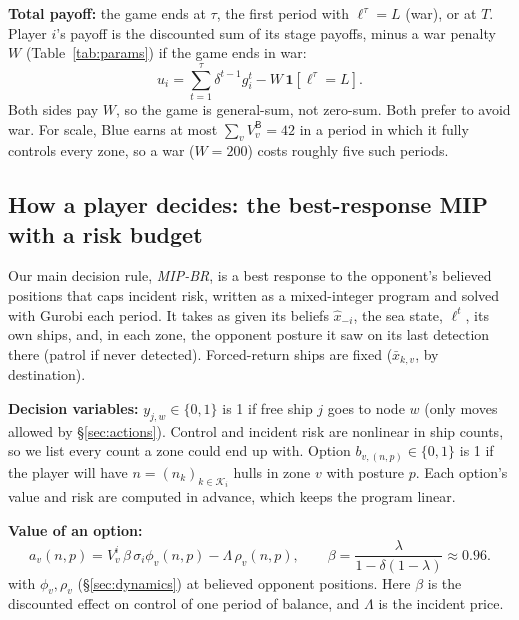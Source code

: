 \documentclass[10pt]{article}
\newcommand{\K}{\mathcal{K}}
\newcommand{\1}{\mathbf{1}}
\newcommand{\B}{\mathsf{B}}
\begin{document}
\textbf{Total payoff:} the game ends at $\tau$, the first period with $\ell^\tau=L$ (war), or at $T$. Player $i$'s
payoff is the discounted sum of its stage payoffs, minus a war penalty $W$ (Table~\ref{tab:params}) if the game ends in war:
\begin{equation}
u_i=\sum_{t=1}^{\tau}\delta^{t-1}g_i^t-W\,\1[\ell^\tau=L].\label{eq:payoff}
\end{equation}
Both sides pay $W$, so the game is general-sum, not zero-sum. Both prefer to avoid war. For scale,
Blue earns at most $\sum_vV^\B_v=42$ in a period in which it fully controls every zone, so a war ($W=200$) costs roughly five such periods.

\subsection{How a player decides: the best-response MIP with a risk budget}\label{sec:mip}
Our main decision rule, \emph{MIP-BR}, is a best response to the opponent's believed positions that caps incident
risk, written as a mixed-integer program and solved with Gurobi each period. It takes as given its beliefs
$\hat x_{-i}$, the sea state, $\ell^t$, its own ships, and, in each zone, the opponent posture it saw on its last
detection there (patrol if never detected). Forced-return ships are fixed ($\bar x_{k,v}$, by destination).

\textbf{Decision variables:} $y_{j,w}\in\{0,1\}$ is 1 if free ship $j$ goes to node $w$ (only moves allowed by
\S\ref{sec:actions}). Control and incident risk are nonlinear in ship counts, so we list every count a zone could
end up with. Option $b_{v,(n,p)}\in\{0,1\}$ is 1 if the player will have $n=(n_k)_{k\in\K_i}$ hulls in zone $v$ with posture
$p$. Each option's value and risk are computed in advance, which keeps the program linear.

\textbf{Value of an option:}\vspace{-4pt}
\[
a_v(n,p)=V^i_v\,\beta\,\sigma_i\phi_v(n,p)-\Lambda\,\rho_v(n,p),\qquad\beta=\frac{\lambda}{1-\delta(1-\lambda)}\approx0.96 .
\]
with $\phi_v,\rho_v$ (\S\ref{sec:dynamics}) at believed opponent positions. Here $\beta$ is the discounted effect
on control of one period of balance, and $\Lambda$ is the incident price.
\end{document}
